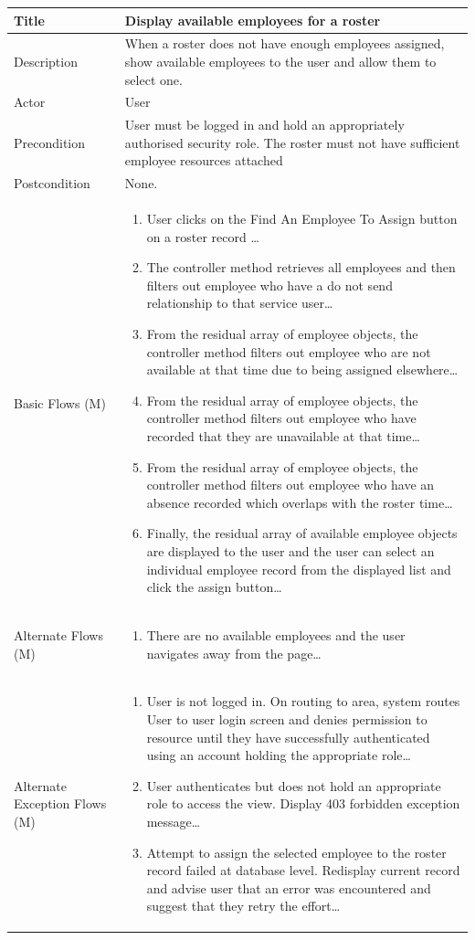 \documentclass[a4paper,12pt]{article}
\newcommand\addrow[2]{#1 &#2\\ }
\newcommand\addheading[2]{#1 &#2\\ \hline}
\newcommand\tabularhead{\begin{tabular}{lp{11cm}}
\hline
}
\newcommand\addmulrow[2]{ \begin{minipage}[t][][t]{3cm}#1\end{minipage}%
   &\begin{minipage}[t][][t]{11cm}
    \begin{enumerate} #2   \end{enumerate}
    \end{minipage}\\ }
\newenvironment{usecase}{\tabularhead}
{\hline\end{tabular}}
\begin{document}
\begin{samepage}
\begin{usecase}
    \addheading{Title}{Display available employees for a roster}
  \addheading{Description}{When a roster does not have enough employees assigned, show available employees to the user and allow them to select one.}
  \addheading{Actor}{User} 
  \addrow{Precondition}{User must be logged in and hold an appropriately authorised security role. The roster must not have sufficient employee resources attached}
  \addrow{Postcondition}{None.}
  \addmulrow{Basic Flows (M)}{\item User clicks on the Find An Employee To Assign button on a roster record \ldots
  \newpage
  \item The controller method retrieves all employees and then filters out employee who have a do not send relationship to that service user\ldots
  \item From the residual array of employee objects, the controller method filters out employee who are not available at that time due to being assigned elsewhere\ldots
    \item From the residual array of employee objects, the controller method filters out employee who have recorded that they are unavailable at that time\ldots
        \item From the residual array of employee objects, the controller method filters out employee who have an absence recorded which overlaps with the roster time\ldots
            \item Finally, the residual array of available employee objects are displayed to the user and the user can select an individual employee record from the displayed list and click the assign button\ldots}
  \addmulrow{Alternate  Flows (M)}{\item There are no available employees and the user navigates away from the page\ldots}
  \addmulrow{Alternate Exception Flows (M)}{\item User is not logged in. On routing to area, system routes User to user login screen and denies permission to resource until they have successfully authenticated using an account holding the appropriate role\ldots
                                                                      \item User authenticates but does not hold an appropriate role to access the  view. Display 403 forbidden exception message\ldots
                                                                      \item Attempt to assign the selected employee to the roster record failed at database level. Redisplay current record and advise user that an error was encountered and suggest that they retry the effort\ldots}
\end{usecase}


\end{samepage}
\end{document}
